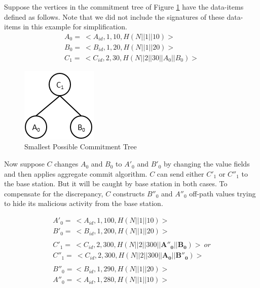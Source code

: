 		\begin{exmp}
			\label{ex1:malicious-activity}
			Suppose the vertices in the commitment tree of Figure \ref{fig:malicious-activity} have the data-items defined as follows.
			Note that we did not include the signatures of these data-items in this example for simplification.
			\begin{equation*}
				\begin{array}{l}
					A_{0} =\ <A_{id},1,10, H(N||1||10)>\\
					B_{0} =\ <B_{id},1,20, H(N||1||20)>\\
					C_{1} =\ <C_{id},2,30, H(N||2||30||A_{0}||B_{0})>
				\end{array}
			\end{equation*}

			\begin{figure}[t]
				\centering
				\includegraphics{images/commitment-tree-2.png}
				\caption{Smallest Possible Commitment Tree}
				\label{fig:malicious-activity}
			\end{figure}

			Now suppose $C$ changes $A_{0}$ and $B_{0}$ to $A'_{0}$ and $B'_{0}$ by changing the value fields and then applies aggregate commit algorithm.
			$C$ can send either $C'_{1}$ or $C''_{1}$ to the base station.
			But it  will be caught by base station in both cases.
			To compensate for the discrepancy, $C$ constructs $B''_{0}$ and $A''_{0}$ off-path values trying to hide its malicious activity from the base station.

			\begin{equation*}
				\begin{array}{l}
					A'_{0} =\ <A_{id},1,100, H(N||1||10)>\\
					B'_{0} =\ <B_{id},1,200, H(N||1||20)>\\
					\\
					C'_{1} =\ <C_{id},2,300, H(N||2||300||\mathbf{A''_{0}}||\mathbf{B_{0}})>\ or \\ 
					C''_{1} =\ <C_{id},2,300, H(N||2||300||\mathbf{A_{0}}||\mathbf{B''_{0}})>\\
					\\
					B''_{0} = <B_{id},1,290,H(N||1||20)>\\
					A''_{0} = <A_{id},1,280,H(N||1||10)>
				\end{array}
			\end{equation*}


\end{exmp}
